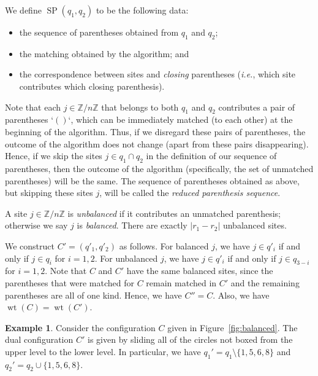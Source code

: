 \documentclass[reqno]{amsart}
\newcommand{\0}{\phantom{c}}
\DeclareMathOperator{\wt}{wt} %
\DeclareMathOperator{\SP}{SP} %
\newcommand{\ZZ}{\mathbb{Z}}
\newcommand{\abs}[1]{\left| #1 \right|}
\newcommand{\defn}[1]{{\color{darkred}\emph{#1}}} %
\theoremstyle{plain}
\theoremstyle{definition}
\newtheorem{example}[thm]{Example}
\numberwithin{equation}{section}
\begin{document}
We define \defn{$\SP(q_1, q_2)$} to be the following data:
\begin{itemize}
\item the sequence of parentheses obtained from $q_1$ and $q_2$;
\item the matching obtained by the algorithm; and
\item the correspondence between sites and \emph{closing} parentheses (\textit{i.e.}, which site contributes which closing parenthesis).
\end{itemize}

Note that each $j \in \ZZ/n\ZZ$ that belongs to both $q_1$ and $q_2$ contributes a pair of parentheses `$()$`, which can be immediately matched (to each other) at the beginning of the algorithm.
Thus, if we disregard these pairs of parentheses, the outcome of the algorithm does not change (apart from these pairs disappearing).
Hence, if we skip the sites $j \in q_1 \cap q_2$ in the definition of our sequence of parentheses, then the outcome of the algorithm (specifically, the set of unmatched parentheses) will be the same.
The sequence of parentheses obtained as above, but skipping these sites $j$, will be called the \defn{reduced parenthesis sequence}.

A site $j \in \ZZ/n\ZZ$ is \defn{unbalanced} if it contributes an unmatched parenthesis; otherwise we say $j$ is \defn{balanced}.
There are exactly $\abs{r_1 - r_2}$ unbalanced sites.

We construct $C' = (q'_1, q'_2)$ as follows.
For balanced $j$, we have $j \in q'_i$ if and only if $j \in q_i$ for $i=1,2$.
For unbalanced $j$, we have $j \in q'_i$ if and only if $j \in q_{3-i}$ for $i = 1,2$.
Note that $C$ and $C'$ have the same balanced sites, since the parentheses that were matched for $C$ remain matched in $C'$ and the remaining parentheses are all of one kind.
Hence, we have $C'' = C$. Also, we have $\wt(C) = \wt(C')$.

\begin{example}
Consider the configuration $C$ given in Figure~\ref{fig:balanced}.
The dual configuration $C'$ is given by sliding all of the circles not boxed from the upper level to the lower level.
In particular, we have $q_1' = q_1 \setminus \{1,5,6,8\}$ and $q_2' = q_2 \cup \{1,5,6,8\}$.
\end{example}
\end{document}

